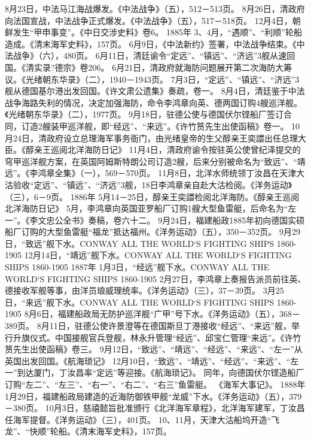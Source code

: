 \documentclass[12pt,UTF8]{ctexbook}
\begin{document}
8月23日，中法马江海战爆发。《中法战争》（五），512－513页。
8月26日，清政府向法国宣战，中法战争正式爆发。《中法战争》（五），517－518页。
12月4日，朝鲜发生“甲申事变”。《中日交涉史料》卷6。
1885年
3、4月，“遇顺”、“利顺”轮船造成。《清末海军史料》，157页。
6月9日，《中法新约》签署，中法战争结束。《中法战争》（六），480页。
6月11日，清廷谕令“定远”、“镇远”、“济远”3舰从速回国。《清实录?德宗》卷206。
6月21日，清政府就海防问题展开第二次海防大筹议。《光绪朝东华录》（二），1940－1943页。
7月3日，“定远”、“镇远”、“济远”3舰从德国基尔港出发回国。《许文肃公遗集》奏疏，卷一。
8月4日，清廷鉴于中法战争海路失利的情况，决定加强海防，命令李鸿章向英、德两国订购4艘巡洋舰。《光绪朝东华录》（二），1977页。
9月18日，驻德公使与德国伏尔铿船厂签订合同，订造2艘装甲巡洋舰，即“经远”、“来远”。《许竹筼先生出使函稿》卷一。
10月24日，清政府设立总理海军事务衙门，由光绪皇帝的生父醇亲王奕譞出任总理大臣。《醇亲王巡阅北洋海防日记》
11月4日，清政府谕令按驻英公使曾纪泽提交的穹甲巡洋舰方案，在英国阿姆斯特朗公司订造2艘，后来分别被命名为“致远”、“靖远”。《李鸿章全集》（一），569－570页。
11月8日，北洋水师统领丁汝昌在天津大沽验收“定远”、“镇远”、“济远”3舰，18日李鸿章亲自赴大沽检阅。《洋务运动》（三），6－9页。
1886年
5月14－25日，醇亲王奕譞检阅北洋海防。《醇亲王巡阅北洋海防日记》
5月，李鸿章向英国亚罗船厂订购1艘大型鱼雷艇，后命名为“左一”。《李文忠公全书》奏稿，卷六十二。
9月24日，福建船政1885年初向德国实硕船厂订购的大型鱼雷艇“福龙”抵达福州。《洋务运动》（五），350－352页。
9月29日，“致远”舰下水。CONWAY ALL THE WORLD`S FIGHTING SHIPS 1860-1905
12月14日，“靖远”舰下水。CONWAY ALL THE WORLD`S FIGHTING SHIPS 1860-1905
1887年
1月3日，“经远”舰下水。CONWAY ALL THE WORLD`S FIGHTING SHIPS 1860-1905
2月27日，李鸿章上奏报告派员前往英、德接收军舰等事，由洋员琅威理统率。《洋务运动》（三），37－39页。
3月25日，“来远”舰下水。CONWAY ALL THE WORLD`S FIGHTING SHIPS 1860-1905
8月6日，福建船政局无防护巡洋舰“广甲”号下水。《洋务运动》（五），368－389页。
8月11日，驻德公使许景澄等在德国斯旦丁港接收“经远”、“来远”舰，举行升旗仪式。中国接舰官兵登舰，林永升管理“经远”、邱宝仁管理“来远”。《许竹筼先生出使函稿》卷三。
9月12日，“致远”、“靖远”、“经远”、“来远”、“左一”从英国出发回国。《航海琐记》
12月10日，“致远”、“靖远”、“经远”、“来远”、“左一”到达厦门，丁汝昌率“定远”等迎接。《航海琐记》。
同年，向德国伏尔铿造船厂订购“左二”、“左三”、“右一”、“右二”、“右三”鱼雷艇。
《海军大事记》。
1888年
1月29日，福建船政局建造的近海防御铁甲舰“龙威”下水。《洋务运动》（五），379－380页。
10月3日，慈禧懿旨批准颁行《北洋海军章程》，北洋海军建军，丁汝昌任海军提督。《洋务运动》（三），401页。
10、11月，天津大沽船坞开造“飞龙”、“快顺”轮船。《清末海军史料》，157页。
\end{document}
